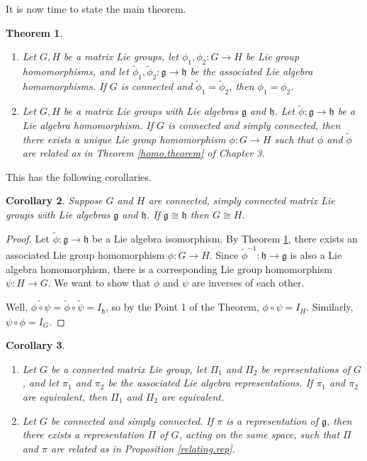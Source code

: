 \documentclass[12pt]{amsbook}
\let \frak = \mathfrak
\theoremstyle{plain}
\newtheorem{theorem}{Theorem}
\newtheorem{corollary}[theorem]{Corollary}
\numberwithin{equation}{chapter}
\numberwithin{theorem}{chapter}
\begin{document}
It is now time to state the main theorem.

\begin{theorem}
\label{exp.rep}

\begin{enumerate}
\item  Let $G,H$ be a matrix Lie groups, let $\phi_{1},\phi_{2}:G\rightarrow
H$ be Lie group homomorphisms, and let $\widetilde{\phi}_{1},\widetilde{\phi
}_{2}:\frak{g}\rightarrow\frak{h}$ be the associated Lie algebra
homomorphisms. If $G$ is \textit{connected} and $\widetilde{\phi}%
_{1}=\widetilde{\phi}_{2}$, then $\phi_{1}=\phi_{2}$.

\item  Let $G,H$ be a matrix Lie groups with Lie algebras $\frak{g}$ and
$\frak{h}$. Let $\widetilde{\phi}:\frak{g\rightarrow h}$ be a Lie algebra
homomorphism. If $G$ is \textit{connected} and \textit{simply}
\textit{connected}, then there exists a unique Lie group homomorphism
$\phi:G\rightarrow H$ such that $\phi$ and $\widetilde{\phi}$ are related as
in Theorem \ref{homo.theorem} of Chapter 3.
\end{enumerate}
\end{theorem}

This has the following corollaries.

\begin{corollary}
Suppose $G$ and $H$ are connected, simply connected matrix Lie groups with Lie
algebras $\frak{g}$ and $\frak{h}$. If $\frak{g}\cong\frak{h}$ then $G\cong H$.
\end{corollary}

\begin{proof}
Let $\widetilde{\phi}:\frak{g}\rightarrow\frak{h}$ be a Lie algebra
isomorphism. By Theorem \ref{exp.rep}, there exists an associated Lie group
homomorphism $\phi:G\rightarrow H$. Since $\widetilde{\phi}^{-1}%
:\frak{h}\rightarrow\frak{g}$ is also a Lie algebra homomorphism, there is a
corresponding Lie group homomorphism $\psi:H\rightarrow G$. We want to show
that $\phi$ and $\psi$ are inverses of each other.

Well, $\widetilde{\phi\circ\psi}=\widetilde{\phi}\circ\widetilde{\psi
}=I_{\frak{h}}$, so by the Point 1 of the Theorem, $\phi\circ\psi=I_{H}$.
Similarly, $\psi\circ\phi=I_{G}$.
\end{proof}

\begin{corollary}
\begin{enumerate}
\item \label{sc.reps}Let $G$ be a \textit{connected} matrix Lie group, let
$\Pi_{1}$ and $\Pi_{2}$ be representations of $G$, and let $\pi_{1}$ and
$\pi_{2}$ be the associated Lie algebra representations. If $\pi_{1}$ and
$\pi_{2}$ are equivalent, then $\Pi_{1}$ and $\Pi_{2}$ are equivalent.

\item  Let $G$ be \textit{connected }and \textit{simply connected}. If $\pi$
is a representation of $\frak{g}$, then there exists a representation $\Pi$ of
$G$, acting on the same space, such that $\Pi$ and $\pi$ are related as in
Proposition \ref{relating.rep}.
\end{enumerate}
\end{corollary}
\end{document}
